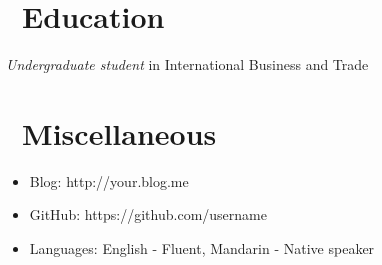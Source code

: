 \documentclass{resume}
\begin{document}
\section{\faGraduationCap\ Education}
\textit{Undergraduate student} in International Business and Trade


\section{\faInfo\ Miscellaneous}
\begin{itemize}[parsep=0.5ex]
  \item Blog: http://your.blog.me
  \item GitHub: https://github.com/username
  \item Languages: English - Fluent, Mandarin - Native speaker
\end{itemize}

%
%
\end{document}
